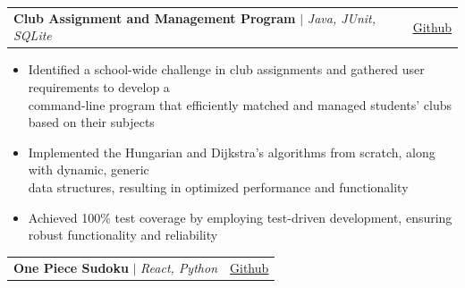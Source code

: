 \documentclass[letterpaper,11pt]{article}
\makeatletter
\newcommand{\resumeItem}[1]{
  \item\small{
    {#1 \vspace{-2pt}}
  }
}
\newcommand{\resumeProjectHeading}[2]{
    \item
    \begin{tabular*}{\textwidth}{l@{\extracolsep{\fill}}r}
      \small#1 & #2 \\
    \end{tabular*}\vspace{-7pt}
}
\newcommand{\resumeItemListStart}{\begin{itemize}}
\newcommand{\resumeItemListEnd}{\end{itemize}\vspace{-5pt}}
\makeatother
\begin{document}
          \resumeProjectHeading
          {\textbf{Club Assignment and Management Program} $|$ \emph{Java, JUnit, SQLite}}{\href{https://github.com/Underdemon/clubMatcher}{\small{\underline{Github}}}}
          \resumeItemListStart
            \resumeItem{Identified a school-wide challenge in club assignments and gathered user requirements to develop a\\command-line program that efficiently matched and managed students' clubs based on their subjects}
            \resumeItem{Implemented the Hungarian and Dijkstra's algorithms from scratch, along with dynamic, generic\\data structures, resulting in optimized performance and functionality}
            \resumeItem{Achieved 100\% test coverage by employing test-driven development, ensuring robust functionality and reliability}
          \resumeItemListEnd

          \resumeProjectHeading
          {\textbf{One Piece Sudoku} $|$ \emph{React, Python}}{\href{https://github.com/Underdemon/one-piece-sudoku}{\small{\underline{Github}}}}


\end{document}
